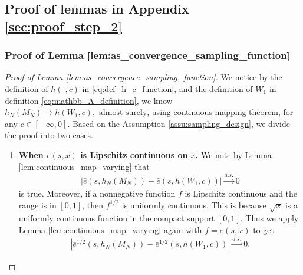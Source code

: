 \documentclass[12pt]{article}
\begin{document}
\subsection{Proof of lemmas in Appendix \ref{sec:proof_step_2}}\label{sec:proof_E_4}



\subsubsection{Proof of Lemma \ref{lem:as_convergence_sampling_function}}

\begin{proof}[Proof of Lemma \ref{lem:as_convergence_sampling_function}]
	We notice by the definition of $h(\cdot,c)$ in \eqref{eq:def_h_c_function}, and the definition of $W_1$ in definition \eqref{eq:mathbb_A_definition}, we know $h_N(M_N)\rightarrow h(W_1,c),\text{ almost surely}$, using continuous mapping theorem, for any $c\in [-\infty,0]$. Based on the Assumption \ref{assu:sampling_design}, we divide the proof into two cases.

	\begin{enumerate}
		\item \textbf{When $\bar e(s,x)$ is Lipschitz continuous on $x$.} 
		We note by Lemma \ref{lem:continuous_map_varying} that 
		\begin{align*}
			|\bar e(s,h_N(M_N))-\bar e(s,h(W_1,c))|\overset{a.s.}{\rightarrow}0
		\end{align*}
		is true. Moreover, if a nonnegative function $f$ is Lipschitz continuous and the range is in $[0,1]$, then $f^{1/2}$ is uniformly continuous. This is because $\sqrt{x}$ is a uniformly continuous function in the compact support $[0,1]$. Thus we apply Lemma \ref{lem:continuous_map_varying} again with $f=\bar e(s,x)$ to get
		\begin{align*}
			|\bar e^{1/2}(s,h_N(M_N))-\bar e^{1/2}(s,h(W_1,c))|\overset{a.s.}{\rightarrow}0.
		\end{align*}
		

\end{enumerate}
\end{proof}
\end{document}
